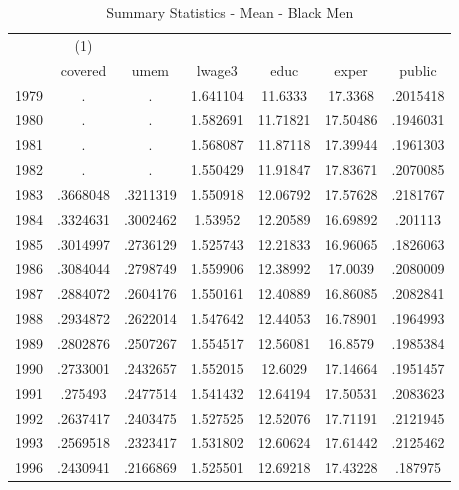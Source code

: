 {
\def\sym#1{\ifmmode^{#1}\else\(^{#1}\)\fi}
\begin{longtable}{l*{1}{cccccc}}
\caption{Summary Statistics - Mean - Black Men}\\
\hline\hline\endfirsthead\hline\endhead\hline\endfoot\endlastfoot
            &\multicolumn{1}{c}{(1)}&            &            &            &            &            \\
            &     covered&        umem&      lwage3&        educ&       exper&      public\\
\hline
1979        &           .&           .&    1.641104&     11.6333&     17.3368&    .2015418\\
1980        &           .&           .&    1.582691&    11.71821&    17.50486&    .1946031\\
1981        &           .&           .&    1.568087&    11.87118&    17.39944&    .1961303\\
1982        &           .&           .&    1.550429&    11.91847&    17.83671&    .2070085\\
1983        &    .3668048&    .3211319&    1.550918&    12.06792&    17.57628&    .2181767\\
1984        &    .3324631&    .3002462&     1.53952&    12.20589&    16.69892&     .201113\\
1985        &    .3014997&    .2736129&    1.525743&    12.21833&    16.96065&    .1826063\\
1986        &    .3084044&    .2798749&    1.559906&    12.38992&     17.0039&    .2080009\\
1987        &    .2884072&    .2604176&    1.550161&    12.40889&    16.86085&    .2082841\\
1988        &    .2934872&    .2622014&    1.547642&    12.44053&    16.78901&    .1964993\\
1989        &    .2802876&    .2507267&    1.554517&    12.56081&     16.8579&    .1985384\\
1990        &    .2733001&    .2432657&    1.552015&     12.6029&    17.14664&    .1951457\\
1991        &     .275493&    .2477514&    1.541432&    12.64194&    17.50531&    .2083623\\
1992        &    .2637417&    .2403475&    1.527525&    12.52076&    17.71191&    .2121945\\
1993        &    .2569518&    .2323417&    1.531802&    12.60624&    17.61442&    .2125462\\
1996        &    .2430941&    .2166869&    1.525501&    12.69218&    17.43228&     .187975\\

\end{longtable}}
